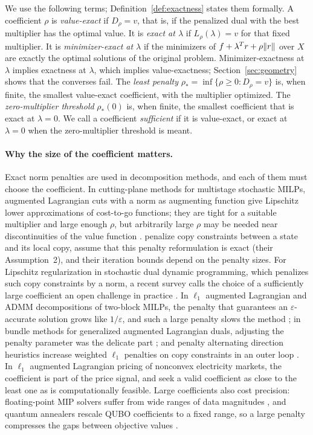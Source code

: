 We use the following terms; Definition~\ref{def:exactness} states them
formally. A coefficient $\rho$ is \emph{value-exact} if $D_\rho=v$, that
is, if the penalized dual with the best multiplier has the optimal value.
It is \emph{exact at $\lambda$} if $L_\rho(\lambda)=v$ for that fixed
multiplier. It is \emph{minimizer-exact at $\lambda$} if the minimizers of
$f+\lambda^Tr+\rho\lVert r\rVert$ over $X$ are exactly the optimal solutions of
the original problem. Minimizer-exactness at $\lambda$ implies exactness
at $\lambda$, which implies value-exactness; Section~\ref{sec:geometry}
shows that the converses fail. The \emph{least penalty}
$\rho_*=\inf\{\rho\ge0:D_\rho=v\}$ is, when finite, the smallest
value-exact coefficient, with the multiplier optimized. The
\emph{zero-multiplier threshold} $\rho_*(0)$ is, when finite, the
smallest coefficient that is exact at $\lambda=0$. We call a coefficient
\emph{sufficient} if it is value-exact, or exact at $\lambda=0$ when the
zero-multiplier threshold is meant.

\paragraph{Why the size of the coefficient matters.}
Exact norm penalties are used in decomposition methods, and each of them
must choose the coefficient. In cutting-plane methods for multistage stochastic MILPs,
augmented Lagrangian cuts with a norm as augmenting function give
Lipschitz lower approximations of cost-to-go functions; they are tight
for a suitable multiplier and large enough $\rho$, but arbitrarily
large $\rho$ may be needed near discontinuities of the value function
\citep{AhmedCabralCosta2022}.
\citet{ZhangSun2022} penalize copy constraints between a state and its
local copy, assume that this penalty reformulation is exact (their
Assumption~2), and their iteration bounds depend on the penalty sizes. For Lipschitz
regularization in stochastic dual dynamic programming, which penalizes
such copy constraints by a norm, a recent survey calls the choice of a
sufficiently large coefficient an open challenge in practice
\citep{FullnerRebennack2025}.
In $\ell_1$ augmented Lagrangian and ADMM decompositions of two-block
MILPs, the penalty that guarantees an $\varepsilon$-accurate solution
grows like $1/\varepsilon$, and such a large penalty slows the method
\citep{SunSunYin2024}; in bundle methods for generalized augmented
Lagrangian duals, adjusting the penalty parameter was the delicate part
\citep{CordovaOliveiraSagastizabal2022}; and penalty alternating
direction heuristics increase weighted $\ell_1$ penalties on copy
constraints in an outer loop \citep{GeisslerMorsiScheweSchmidt2017}.
In $\ell_1$ augmented Lagrangian pricing of nonconvex electricity
markets, the coefficient is part of the price signal, and
\citet{WangHesamzadehZhaoKronqvist2026} seek a valid coefficient as close
to the least one as is computationally feasible. Large coefficients
also cost precision: floating-point MIP solvers suffer from wide ranges
of data magnitudes \citep{KlotzNewman2013}, and quantum annealers rescale
QUBO coefficients to a fixed range, so a large penalty compresses the
gaps between objective values \citep{KrpanPovhPucher2025}.

